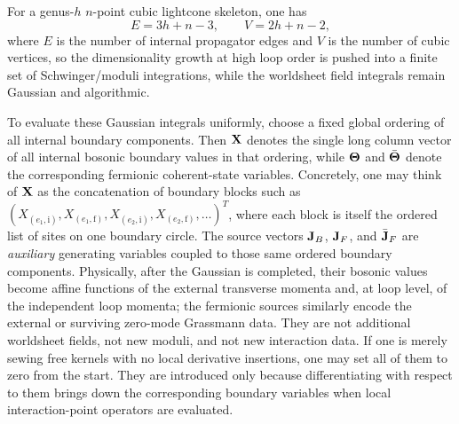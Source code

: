 \documentclass[11pt]{article}
\numberwithin{equation}{section}
\begin{document}
For a genus-$h$ $n$-point cubic lightcone skeleton, one has
\begin{equation}
\label{eq:s8-004}
E=3h+n-3,\qquad V=2h+n-2,
\end{equation}
where $E$ is the number of internal propagator edges and $V$ is the number of cubic vertices,
so the dimensionality growth at high loop order is pushed into a finite set of Schwinger/moduli integrations, while the worldsheet field integrals remain Gaussian and algorithmic.

To evaluate these Gaussian integrals uniformly, choose a fixed global ordering of all internal boundary components. Then ${\bf X}$ denotes the single long column vector of all internal bosonic boundary values in that ordering, while ${\bf \Theta}$ and $\bar{\bf \Theta}$ denote the corresponding fermionic coherent-state variables. Concretely, one may think of ${\bf X}$ as the concatenation of boundary blocks such as $(X_{(e_1,\mathrm i)},X_{(e_1,\mathrm f)},X_{(e_2,\mathrm i)},X_{(e_2,\mathrm f)},\dots)^T$, where each block is itself the ordered list of sites on one boundary circle. The source vectors ${\bf J}_B$, ${\bf J}_F$, and $\bar{\bf J}_F$ are \emph{auxiliary} generating variables coupled to those same ordered boundary components. Physically, after the Gaussian is completed, their bosonic values become affine functions of the external transverse momenta and, at loop level, of the independent loop momenta; the fermionic sources similarly encode the external or surviving zero-mode Grassmann data. They are not additional worldsheet fields, not new moduli, and not new interaction data. If one is merely sewing free kernels with no local derivative insertions, one may set all of them to zero from the start. They are introduced only because differentiating with respect to them brings down the corresponding boundary variables when local interaction-point operators are evaluated.
\end{document}
